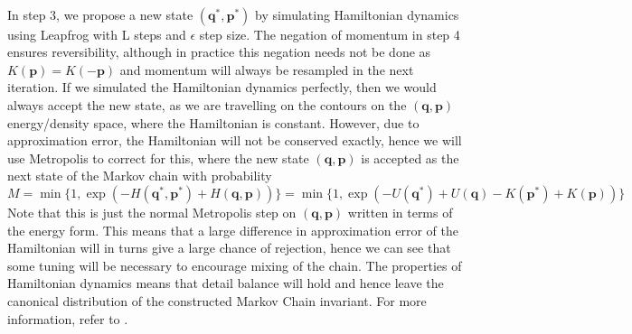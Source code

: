 \documentclass[11pt]{article}
\begin{document}
\\
In step 3, we propose a new state $(\mathbf{q^{*}},\mathbf{p^{*}})$ by simulating Hamiltonian dynamics using Leapfrog with L steps and $\epsilon$ step size. The negation of momentum in step 4 ensures reversibility, although in practice this negation needs not be done as $K(\mathbf{p})=K(-\mathbf{p})$ and momentum will always be resampled in the next iteration. If we simulated the Hamiltonian dynamics perfectly, then we would always accept the new state, as we are travelling on the contours on the $(\mathbf{q},\mathbf{p})$ energy/density space, where the Hamiltonian is constant. However, due to approximation error, the Hamiltonian will not be conserved exactly, hence we will use Metropolis to correct for this, where the new state $(\mathbf{q},\mathbf{p})$ is accepted as the next state of the Markov chain with probability
\begin{equation}
M=\min \{1,\exp(-H(\mathbf{q^{*}},\mathbf{p^{*}})+H(\mathbf{q},\mathbf{p}))\} = \min\{1, \exp(-U(\mathbf{q^{*}})+U(\mathbf{q})-K(\mathbf{p^{*}})+K(\mathbf{p}))\}
\end{equation}
Note that this is just the normal Metropolis step on $(\mathbf{q},\mathbf{p})$ written in terms of the energy form. This means that a large difference in approximation error of the Hamiltonian  will in turns give a large chance of rejection, hence we can see that some tuning will be necessary to encourage mixing of the chain. The properties of Hamiltonian dynamics means that detail balance will hold and hence leave the canonical distribution of the constructed Markov Chain invariant. For more information, refer to \cite{neal}.
\end{document}
